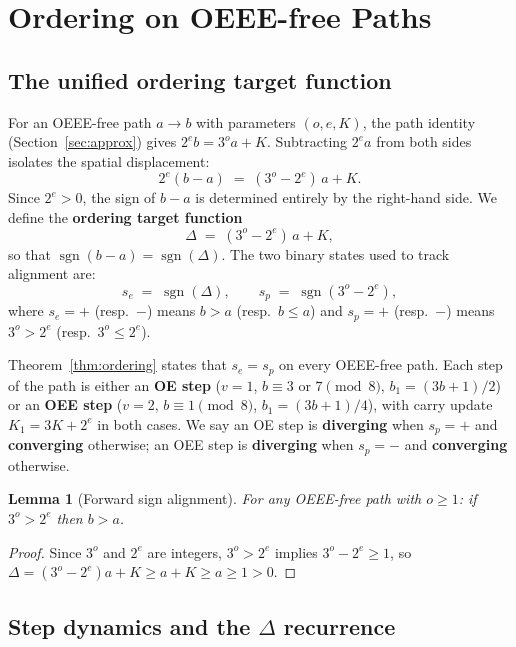 \documentclass[11pt]{article}
\newtheorem{lemma}{Lemma}[section]
\begin{document}
\section{Ordering on OEEE-free Paths}
\label{sec:ordering}

\subsection{The unified ordering target function}

For an OEEE-free path $a \to b$ with parameters $(o, e, K)$, the path
identity (Section~\ref{sec:approx}) gives $2^e b = 3^o a + K$.
Subtracting $2^e a$ from both sides isolates the spatial displacement:
\[
  2^e(b - a) \;=\; (3^o - 2^e)\,a + K.
\]
Since $2^e > 0$, the sign of $b - a$ is determined entirely by the
right-hand side.  We define the \textbf{ordering target function}
\[
  \Delta \;=\; (3^o - 2^e)\,a + K,
\]
so that $\operatorname{sgn}(b - a) = \operatorname{sgn}(\Delta)$.  The two
binary states used to track alignment are:
\[
  s_e \;=\; \operatorname{sgn}(\Delta), \qquad
  s_p \;=\; \operatorname{sgn}(3^o - 2^e),
\]
where $s_e = +$ (resp.\ $-$) means $b > a$ (resp.\ $b \leq a$) and
$s_p = +$ (resp.\ $-$) means $3^o > 2^e$ (resp.\ $3^o \leq 2^e$).

Theorem~\ref{thm:ordering} states that $s_e = s_p$ on every OEEE-free path.
Each step of the path is either an \textbf{OE step} ($v = 1$, $b \equiv 3$
or $7\pmod{8}$, $b_1 = (3b+1)/2$) or an \textbf{OEE step} ($v = 2$,
$b \equiv 1\pmod{8}$, $b_1 = (3b+1)/4$), with carry update $K_1 = 3K + 2^e$
in both cases.  We say an OE step is \textbf{diverging} when $s_p = +$ and
\textbf{converging} otherwise; an OEE step is \textbf{diverging} when
$s_p = -$ and \textbf{converging} otherwise.

\begin{lemma}[Forward sign alignment]
\label{lem:pos}
For any OEEE-free path with $o \geq 1$: if $3^o > 2^e$ then $b > a$.
\end{lemma}
\begin{proof}
Since $3^o$ and $2^e$ are integers, $3^o > 2^e$ implies $3^o - 2^e \geq 1$,
so $\Delta = (3^o - 2^e)a + K \geq a + K \geq a \geq 1 > 0$.
\end{proof}

\subsection{Step dynamics and the $\Delta$ recurrence}
\end{document}
